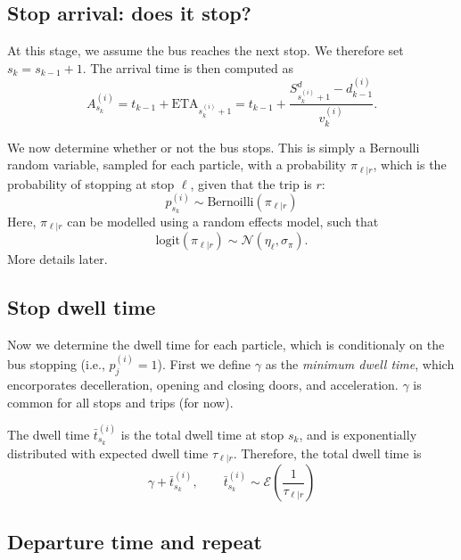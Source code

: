 \documentclass[14paper,twoside]{article}
\begin{document}
\subsection{Stop arrival: does it stop?}

At this stage, we assume the bus reaches the next stop.
We therefore set $s_k = s_{k-1} + 1$.
The arrival time is then computed as
\begin{equation}
  \label{eq:arrival_time}
  A_{s_k}^{(i)} = t_{k-1} + \mathrm{ETA}_{s_{k}^{(i)} + 1}
  = t_{k-1} + \frac{S^d_{s_{k}^{(i)} + 1} - d_{k-1}^{(i)}}{v_k^{(i)}}.
\end{equation}

We now determine whether or not the bus stops.
This is simply a Bernoulli random variable, sampled for each particle,
with a probability $\pi_{\ell|r}$, which is the probability
of stopping at stop $\ell$, given that the trip is $r$:
\begin{equation}
  \label{eq:bus_stopped}
  p_{s_k}^{(i)} \sim \mathrm{Bernoilli}\left(\pi_{\ell|r}\right)
\end{equation}
Here, $\pi_{\ell|r}$ can be modelled using a random effects model,
such that
\begin{equation}
  \label{eq:pi_model}
  \mathrm{logit}\left(\pi_{\ell|r}\right) \sim \mathcal{N}\left(\eta_\ell, \sigma_\pi \right).
\end{equation}
More details later.



\subsection{Stop dwell time}

Now we determine the dwell time for each particle,
which is conditionaly on the bus stopping (i.e., $p_j^{(i)} = 1$).
First we define $\gamma$ as the \emph{minimum dwell time},
which encorporates decelleration, opening and closing doors, and acceleration.
$\gamma$ is common for all stops and trips (for now).

The dwell time $\bar t_{s_k}^{(i)}$ is the total dwell time at stop $s_k$,
and is exponentially distributed with expected dwell time $\tau_{\ell|r}$.
Therefore, the total dwell time is
\begin{equation}
  \label{eq:total_dwell_time}
  \gamma + \bar t_{s_k}^{(i)}, \qquad \bar t_{s_k}^{(i)} \sim \mathcal{E}\left(\frac{1}{\tau_{\ell|r}}\right)
\end{equation}


\subsection{Departure time and repeat}
\end{document}
